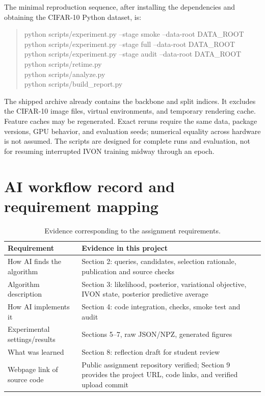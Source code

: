 \documentclass[11pt,a4paper]{article}
\begin{document}
The minimal reproduction sequence, after installing the dependencies and obtaining
the CIFAR-10 Python dataset, is:
\begin{quote}\small\ttfamily
python scripts/experiment.py --stage smoke --data-root DATA\_ROOT\\
python scripts/experiment.py --stage full --data-root DATA\_ROOT\\
python scripts/experiment.py --stage audit --data-root DATA\_ROOT\\
python scripts/retime.py\\
python scripts/analyze.py\\
python scripts/build\_report.py
\end{quote}
The shipped archive already contains the backbone and split indices. It excludes
the CIFAR-10 image files, virtual environments, and temporary rendering cache.
Feature caches may be regenerated. Exact reruns require the same data, package
versions, GPU behavior, and evaluation seeds; numerical equality across hardware
is not assumed. The scripts are designed for complete runs and evaluation, not
for resuming interrupted IVON training midway through an epoch.

\section{AI workflow record and requirement mapping}
\begin{table}[H]\centering\small
\caption{Evidence corresponding to the assignment requirements.}
\begin{tabular}{p{}p{}}\toprule
Requirement & Evidence in this project \\\midrule
How AI finds the algorithm & Section 2: queries, candidates, selection rationale,
publication and source checks \\
Algorithm description & Section 3: likelihood, posterior, variational objective,
IVON state, posterior predictive average \\
How AI implements it & Section 4: code integration, checks, smoke test and audit \\
Experimental settings/results & Sections 5--7, raw JSON/NPZ, generated figures \\
What was learned & Section 8: reflection draft for student review \\
Webpage link of source code & Public assignment repository verified; Section 9
provides the project URL, code links, and verified upload commit \\\bottomrule
\end{tabular}\end{table}
\end{document}
